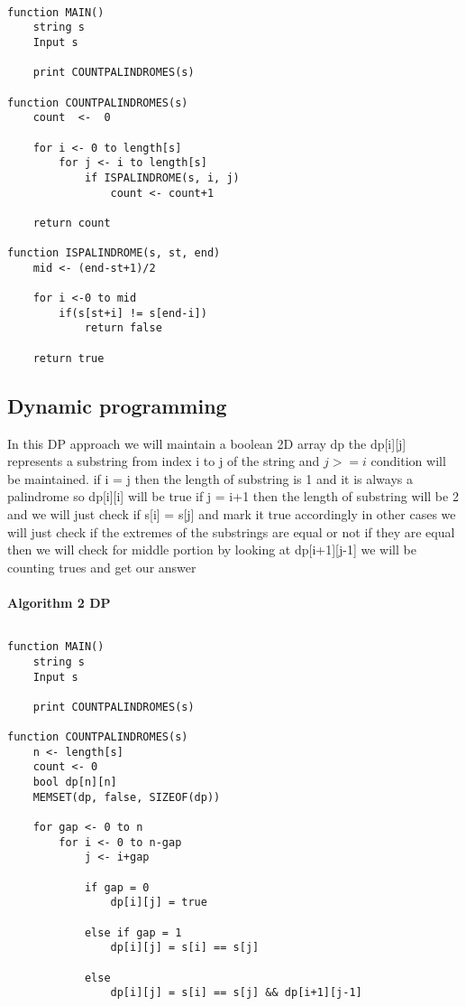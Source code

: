 \documentclass[12pt, a4paper]{report}
\begin{document}
\begin{multicols}{2}
\begin{lstlisting}

function MAIN()
	string s
	Input s

	print COUNTPALINDROMES(s)

function COUNTPALINDROMES(s)
	count  <-  0

	for i <- 0 to length[s]
		for j <- i to length[s]
			if ISPALINDROME(s, i, j)
				count <- count+1

	return count

function ISPALINDROME(s, st, end)
	mid <- (end-st+1)/2

	for i <-0 to mid
		if(s[st+i] != s[end-i])
			return false

	return true

\end{lstlisting}


\subsection{Dynamic programming}

In this DP approach we will maintain a boolean 2D array dp
the dp[i][j] represents a substring from index i to j of the string
and $j >= i$ condition will be maintained.
if i = j then the length of substring is 1 and it is always a palindrome
so dp[i][i] will be true
if j = i+1 then the length of substring will be 2 and we will just check if s[i] = s[j]
and mark it true accordingly
in other cases we will just check if the extremes of the substrings are equal or not
if they are equal then we will check for middle portion by looking at dp[i+1][j-1]
we will be counting trues and get our answer\\
\hline\\

\textbf{Algorithm 2 DP}
\begin{lstlisting}

function MAIN()
	string s
	Input s

	print COUNTPALINDROMES(s)

function COUNTPALINDROMES(s)
	n <- length[s]
	count <- 0
	bool dp[n][n]
	MEMSET(dp, false, SIZEOF(dp))

	for gap <- 0 to n
		for i <- 0 to n-gap
			j <- i+gap

			if gap = 0
				dp[i][j] = true

			else if gap = 1
				dp[i][j] = s[i] == s[j]

			else
				dp[i][j] = s[i] == s[j] && dp[i+1][j-1]


\end{lstlisting}
\end{multicols}
\end{document}
